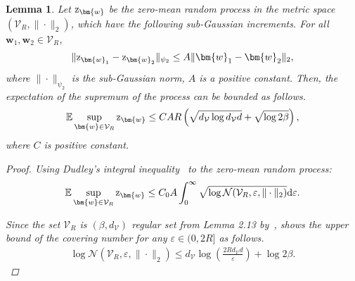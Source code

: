 \documentclass{article}
\def\rz{{\textnormal{z}}}
\theoremstyle{plain}
\newtheorem{lemma}[theorem]{Lemma}
\theoremstyle{definition}
\theoremstyle{remark}
\begin{document}
\begin{lemma}
\label{lem:sup_z}
Let \(\rz_{\bm{w}}\) be the zero-mean random process in the metric space \((\mathcal{V}_R, \|\cdot\|_2)\), which have the following sub-Gaussian increments. For all \(\bm{w}_1, \bm{w}_2 \in \mathcal{V}_R\),
\begin{align*}
    \| \rz_{\bm{w}_1} - \rz_{\bm{w}_2} \|_{\psi_2} \leq A \|\bm{w}_1 - \bm{w}_2\|_2,
\end{align*}
where \(\|\cdot\|_{\psi_2}\) is the sub-Gaussian norm, \(A\) is a positive constant. Then, the expectation of the supremum of the process can be bounded as follows.
\begin{align*}
    \mathbb{E}\sup_{\bm{w} \in \mathcal{V}_R} \rz_{\bm{w}}\leq C A R \left( \sqrt{d_{\mathcal{V}}\log d_{\mathcal{V}}d} + \sqrt{\log 2\beta} \right),
\end{align*}
where \(C\) is positive constant. 

\begin{proof}
Using Dudley’s integral inequality~\citep{dudley1967sizes} to the zero-mean random process:
\begin{gather}
    \label{eq:cov_bound_for_GP}
    \mathbb{E} \sup_{\bm{w} \in \mathcal{V}_R} \rz_{\bm{w}} \leq C_0 A \int_0^{\infty} \sqrt{\log \mathcal{N}(\mathcal{V}_R, \varepsilon, \|\cdot\|_2)} \mathrm{d}\varepsilon.
\end{gather}

Since the set \(\mathcal{V}_R\) is \((\beta, d_{\mathcal{V}}
)\) regular set from Lemma 2.13 by~\citet{zhang2023covering},  shows the upper bound of the covering number for any $\varepsilon \in (0, 2R]$ as follows. 
\begin{align*}
    \log \mathcal{N}(\mathcal{V}_R, \varepsilon, \|\cdot\|_2) \leq d_{\mathcal{V}} \log \left(\frac{2Rd_{\mathcal{V}} d}{\varepsilon}\right) + \log 2\beta.
\end{align*}


\end{proof}
\end{lemma}
\end{document}
